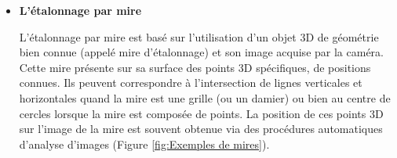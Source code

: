   \begin{itemize}[label={\Huge$\star$}]
  	 
  \item \textbf{L’étalonnage par mire}
  
  L’étalonnage par mire est basé sur l’utilisation d’un objet 3D de géométrie bien connue (appelé mire d’étalonnage) et son image acquise par la caméra. Cette mire présente sur sa surface des points 3D spécifiques, de positions connues. Ils peuvent correspondre à l’intersection de lignes verticales et horizontales quand la mire est une grille (ou un damier) ou bien au centre de cercles lorsque la mire est composée de points. La position de ces points 3D sur l’image de la mire est souvent obtenue via des procédures automatiques d’analyse d’images\cite{faugeras_three-dimensional_1993,eikosim_etalonnage_2021}  (Figure \ref{fig:Exemples de mires}).
  

\end{itemize}
